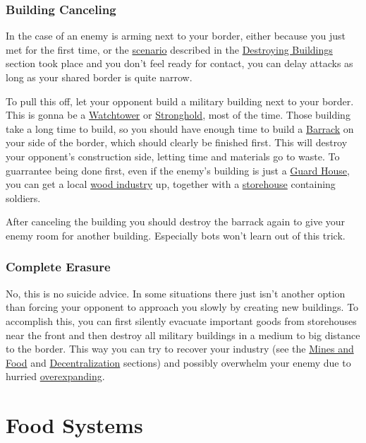 \documentclass[12pt]{article}
\begin{document}
\subsubsection{Building Canceling}
\label{sec:buildingcanceling}

In the case of an enemy is arming next to your border, either because you just met for the first time, or the \hyperref[wastingenemyresourcesbydestroyingbuildings]{scenario} described in the \hyperref[sec:destroyingbuildings]{Destroying Buildings} section took place and you don't feel ready for contact, you can delay attacks as long as your shared border is quite narrow.

To pull this off, let your opponent build a military building next to your border. This is gonna be a \hyperref[sec:watchtower]{Watchtower} or \hyperref[sec:stronghold]{Stronghold}, most of the time. Those building take a long time to build, so you should have enough time to build a \hyperref[sec:barrack]{Barrack} on your side of the border, which should clearly be finished first. This will destroy your opponent's construction side, letting time and materials go to waste. To guarrantee being done first, even if the enemy's building is just a \hyperref[sec:guardhouse]{Guard House}, you can get a local \hyperref[sec:woodindustry]{wood industry} up, together with a \hyperref[sec:storehouse]{storehouse} containing soldiers.

After canceling the building you should destroy the barrack again to give your enemy room for another building. Especially bots won't learn out of this trick.

\subsubsection{Complete Erasure}
\label{sec:completeerasure}

No, this is no suicide advice. In some situations there just isn't another option than forcing your opponent to approach you slowly by creating new buildings. To accomplish this, you can first silently evacuate important goods from storehouses near the front and then destroy all military buildings in a medium to big distance to the border. This way you can try to recover your industry (see the \hyperref[sec:minesandfoot]{Mines and Food} and \hyperref[sec:decentralization]{Decentralization} sections) and possibly overwhelm your enemy due to hurried \hyperref[sec:overexpansion]{overexpanding}.

\section{Food Systems}
\label{sec:foodsystems}
\end{document}

